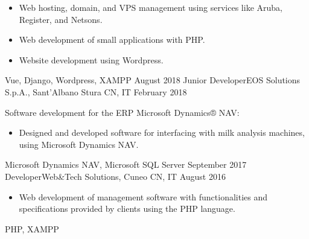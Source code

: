 \begin{experiences}
{\begin{itemize}
            These management systems generally revolved around customer management, appointments, sales orders, quotes, rentals, interventions, or maintenance.
			\item Web hosting, domain, and VPS management using services like Aruba, Register, and Netsons.
			\item Web development of small applications with PHP.
			\item Website development using Wordpress.                         
		\end{itemize}
	}
	{Vue, Django, Wordpress, XAMPP}
	\emptySeparator
	\emptySeparator
	\experience
	{August 2018} {Junior Developer}{EOS Solutions S.p.A., Sant'Albano Stura CN, IT}
	{February 2018}    {
		Software development for the ERP Microsoft Dynamics® NAV:
		\begin{itemize}
			\item Designed and developed software for interfacing with milk analysis machines, using Microsoft Dynamics NAV.                     
		\end{itemize}
	}
	{Microsoft Dynamics NAV, Microsoft SQL Server}
	\emptySeparator
	\emptySeparator
	\experience
	{September 2017}     {Developer}{Web\&Tech Solutions, Cuneo CN, IT}
	{August 2016}    {
		\begin{itemize}
			\item Web development of management software with functionalities and specifications provided by clients using the PHP language.
		\end{itemize}
	}
	{PHP, XAMPP}
	\emptySeparator
	 
	
\end{experiences}
